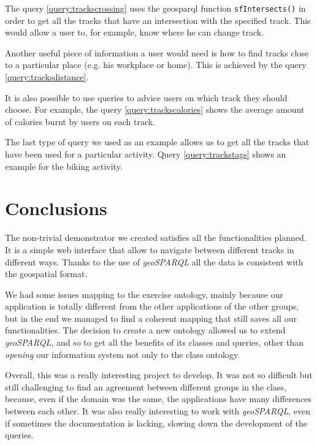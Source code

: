 \documentclass[11pt,a4paper]{scrreprt}
\begin{document}
The query \ref{query:trackscrossing} uses the geosparql function \texttt{sfIntersects()} in order to get all the tracks that have an intersection with the specified track. This would allow a user to, for example, know where he can change track.

Another useful piece of information a user would need is how to find tracks close to a particular place (e.g. his workplace or home). This is achieved by the query \ref{query:tracksdistance}.

It is also possible to use queries to advice users on which track they should choose. For example, the query \ref{query:trackscalories} shows the average amount of calories burnt by users on each track.

The last type of query we used as an example allows us to get all the tracks that have been used for a particular activity. Query \ref{query:trackstags} shows an example for the biking activity.





\chapter{Conclusions}
The non-trivial demonstrator we created satisfies all the functionalities planned. 
It is a simple web interface that allow to navigate between different tracks in different ways. Thanks to the use of \textit{geoSPARQL} all the data is consistent with the geospatial format.

We had some issues mapping to the exercise ontology, mainly because our application is totally different from the other applications of the other groups, but in the end we managed to find a coherent mapping that still saves all our functionalities.
The decision to create a new ontology allowed us to extend \textit{geoSPARQL}, and so to get all the benefits of its classes and queries, other than \textit{opening} our information system not only to the class ontology.

Overall, this was a really interesting project to develop. 
It was not so difficult but still challenging to find an agreement between different groups in the class, because, even if the domain was the same, the applications have many differences between each other.
It was also really interesting to work with \textit{geoSPARQL}, even if sometimes the documentation is lacking, slowing down the development of the queries.
\end{document}
